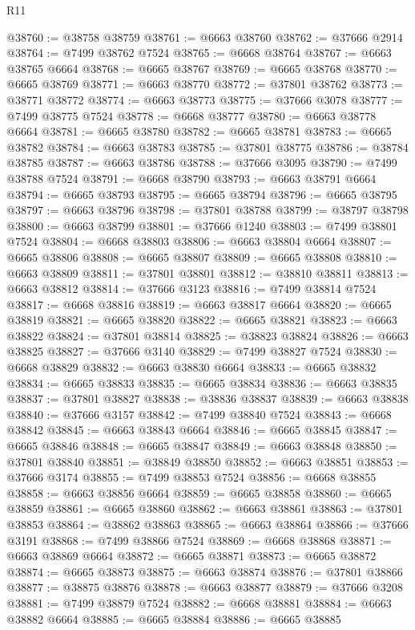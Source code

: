 \begin{lexlean}{R11}
\begin{coremodule}
@38760 := @38758 @38759
@38761 := @6663 @38760
@38762 := @37666 @2914
@38764 := @7499 @38762 @7524
@38765 := @6668 @38764
@38767 := @6663 @38765 @6664
@38768 := @6665 @38767
@38769 := @6665 @38768
@38770 := @6665 @38769
@38771 := @6663 @38770
@38772 := @37801 @38762
@38773 := @38771 @38772
@38774 := @6663 @38773
@38775 := @37666 @3078
@38777 := @7499 @38775 @7524
@38778 := @6668 @38777
@38780 := @6663 @38778 @6664
@38781 := @6665 @38780
@38782 := @6665 @38781
@38783 := @6665 @38782
@38784 := @6663 @38783
@38785 := @37801 @38775
@38786 := @38784 @38785
@38787 := @6663 @38786
@38788 := @37666 @3095
@38790 := @7499 @38788 @7524
@38791 := @6668 @38790
@38793 := @6663 @38791 @6664
@38794 := @6665 @38793
@38795 := @6665 @38794
@38796 := @6665 @38795
@38797 := @6663 @38796
@38798 := @37801 @38788
@38799 := @38797 @38798
@38800 := @6663 @38799
@38801 := @37666 @1240
@38803 := @7499 @38801 @7524
@38804 := @6668 @38803
@38806 := @6663 @38804 @6664
@38807 := @6665 @38806
@38808 := @6665 @38807
@38809 := @6665 @38808
@38810 := @6663 @38809
@38811 := @37801 @38801
@38812 := @38810 @38811
@38813 := @6663 @38812
@38814 := @37666 @3123
@38816 := @7499 @38814 @7524
@38817 := @6668 @38816
@38819 := @6663 @38817 @6664
@38820 := @6665 @38819
@38821 := @6665 @38820
@38822 := @6665 @38821
@38823 := @6663 @38822
@38824 := @37801 @38814
@38825 := @38823 @38824
@38826 := @6663 @38825
@38827 := @37666 @3140
@38829 := @7499 @38827 @7524
@38830 := @6668 @38829
@38832 := @6663 @38830 @6664
@38833 := @6665 @38832
@38834 := @6665 @38833
@38835 := @6665 @38834
@38836 := @6663 @38835
@38837 := @37801 @38827
@38838 := @38836 @38837
@38839 := @6663 @38838
@38840 := @37666 @3157
@38842 := @7499 @38840 @7524
@38843 := @6668 @38842
@38845 := @6663 @38843 @6664
@38846 := @6665 @38845
@38847 := @6665 @38846
@38848 := @6665 @38847
@38849 := @6663 @38848
@38850 := @37801 @38840
@38851 := @38849 @38850
@38852 := @6663 @38851
@38853 := @37666 @3174
@38855 := @7499 @38853 @7524
@38856 := @6668 @38855
@38858 := @6663 @38856 @6664
@38859 := @6665 @38858
@38860 := @6665 @38859
@38861 := @6665 @38860
@38862 := @6663 @38861
@38863 := @37801 @38853
@38864 := @38862 @38863
@38865 := @6663 @38864
@38866 := @37666 @3191
@38868 := @7499 @38866 @7524
@38869 := @6668 @38868
@38871 := @6663 @38869 @6664
@38872 := @6665 @38871
@38873 := @6665 @38872
@38874 := @6665 @38873
@38875 := @6663 @38874
@38876 := @37801 @38866
@38877 := @38875 @38876
@38878 := @6663 @38877
@38879 := @37666 @3208
@38881 := @7499 @38879 @7524
@38882 := @6668 @38881
@38884 := @6663 @38882 @6664
@38885 := @6665 @38884
@38886 := @6665 @38885

\end{coremodule}
\end{lexlean}
